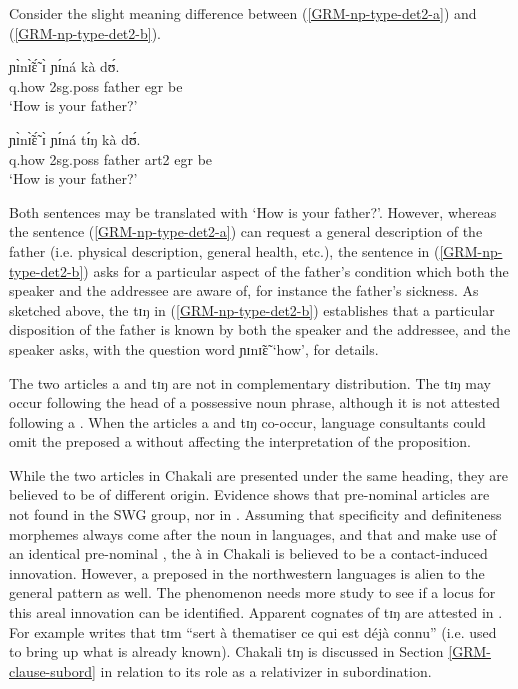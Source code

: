 \begin{exe}
\begin{exe}
\begin{exe}
\begin{exe}
\begin{exe}
\begin{exe}
Consider the slight meaning difference between
(\ref{GRM-np-type-det2-a}) and (\ref{GRM-np-type-det2-b}).


\ea\label{GRM-np-type-det2-ab}
 
  \ea\label{GRM-np-type-det2-a}
\gll ɲɪ̀nɪ̃̀ɛ̃́ ɪ̀ ɲɪ́ná kà dʊ́.\\
 {\sc q}.how {\sc 2sg.poss} father {\sc  egr} be\\
\glt  `How is your father?'

  \ex\label{GRM-np-type-det2-b}
\gll ɲɪ̀nɪ̃̀ɛ̃́ ɪ̀ ɲɪ́ná tɪ́ŋ kà dʊ́.\\
   {\sc q}.how {\sc 2sg.poss} father {\sc art2} {\sc  egr} be\\
\glt  `How is your father?'
  
 
\z 
 \z


Both sentences may be translated with `How is your father?'. However, where\-as 
the sentence (\ref{GRM-np-type-det2-a}) can request  a general description
of the father (i.e.  physical description, general health, etc.), the sentence
in (\ref{GRM-np-type-det2-b}) asks for a particular aspect of the
father's condition which both the speaker and the addressee are aware of, for
instance the father's sickness. As sketched above, the  {\sls tɪŋ}  in
(\ref{GRM-np-type-det2-b}) establishes that a particular disposition of the
father is known  by both the speaker and the addressee,  and the speaker
asks, with the question word {\sls ɲɪnɪ̃ɛ̃} `how',   for details. 

The two  articles {\sls a} and {\sls tɪŋ}  are not in complementary 
distribution. The  {\sls tɪŋ} may occur following the head of a possessive noun phrase,
although it is not attested  following a . When the articles {\sls 
a} and {\sls tɪŋ} co-occur,  language consultants could omit
the preposed {\sls a}  without affecting the interpretation of the
 proposition. 

While the  two articles  in Chakali are presented under the same heading, they are  believed to be 
of different origin.  Evidence shows that pre-nominal articles are not found in the SWG group, nor 
in   \citep[153]{Bonv88}. Assuming that specificity and definiteness morphemes  always come 
after the noun in  languages, and that   and   make use of 
an 
 identical pre-nominal  {\sls }, the   {\sls à} in Chakali is believed to be a 
contact-induced innovation. However, a preposed  in the northwestern languages is alien to the general  pattern as well. The phenomenon needs more study to see if a locus for this areal  innovation can be identified. Apparent cognates of  {\sls tɪŋ} are attested in . For 
example   \citet[180]{Bonv88} writes that   {\sls tɪm}  ``sert à thematiser ce qui est 
déjà connu'' (i.e. used to bring up what is already known).  Chakali {\sls tɪŋ} is discussed in 
Section \ref{GRM-clause-subord}  in relation to its role as a relativizer in subordination.



\end{exe}
\end{exe}
\end{exe}
\end{exe}
\end{exe}
\end{exe}
